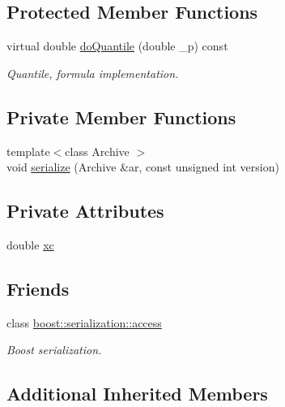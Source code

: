 \subsection*{Protected Member Functions}
\begin{DoxyCompactItemize}
\item 
virtual double \hyperlink{class_c_constant_c_r_v_a7a3d90e12dbff50c473433f7d94de163}{do\-Quantile} (double \-\_\-p) const 
\begin{DoxyCompactList}\small\item\em Quantile, formula implementation. \end{DoxyCompactList}\end{DoxyCompactItemize}
\subsection*{Private Member Functions}
\begin{DoxyCompactItemize}
\item 
{\footnotesize template$<$class Archive $>$ }\\void \hyperlink{class_c_constant_c_r_v_a5fdc32e0b2c507f4c9e2532e57f93d59}{serialize} (Archive \&ar, const unsigned int version)
\end{DoxyCompactItemize}
\subsection*{Private Attributes}
\begin{DoxyCompactItemize}
\item 
double \hyperlink{class_c_constant_c_r_v_a2a82360ef61c3c3ea5b4728f82f3e489}{xc}
\end{DoxyCompactItemize}
\subsection*{Friends}
\begin{DoxyCompactItemize}
\item 
class \hyperlink{class_c_constant_c_r_v_ac98d07dd8f7b70e16ccb9a01abf56b9c}{boost\-::serialization\-::access}
\begin{DoxyCompactList}\small\item\em Boost serialization. \end{DoxyCompactList}\end{DoxyCompactItemize}
\subsection*{Additional Inherited Members}


